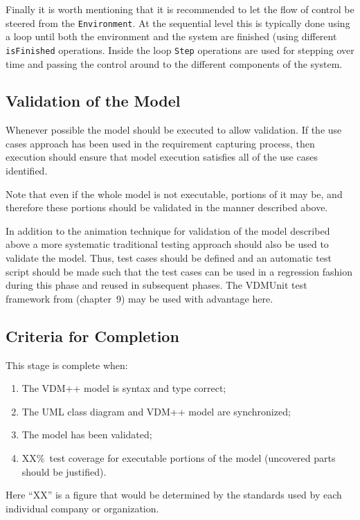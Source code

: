 \documentclass{overturerepchap}
\begin{document}
Finally it is worth mentioning that it is recommended to let the flow of
control be steered from the \texttt{Environment}. At the sequential level
this is typically done using a loop until both the environment and the
system are finished (using different \texttt{isFinished} operations. Inside 
the loop \texttt{Step} operations are used for stepping over time and 
passing the control around to the different components of the system.

\subsection{Validation of the Model}

Whenever possible the model should be executed to allow validation. If
the use cases approach has been used in the requirement capturing
process, then execution should ensure that model execution satisfies
all of the use cases identified.

Note that even if the whole model is not executable, portions of it
may be, and therefore these portions should be validated in the manner
described above.

In addition to the animation technique for validation of the model
described above a more systematic traditional testing approach should
also be used to validate the model.  Thus, test cases should be
defined and an automatic test script should be made such that the test
cases can be used in a regression fashion during this phase and reused
in subsequent phases. The VDMUnit test framework from
\cite{Fitzgerald&05} (chapter~9) may be used with advantage here.

\subsection{Criteria for Completion}

This stage is complete when:

\begin{enumerate}
\item The VDM++ model is syntax and type correct;
\item The UML class diagram and VDM++ model are synchronized;
\item The model has been validated;
\item XX\%\ test coverage for executable portions of the model
(uncovered parts should be justified).
\end{enumerate}

Here ``XX'' is a figure that would be determined by the standards used
by each individual company or organization.
\end{document}
